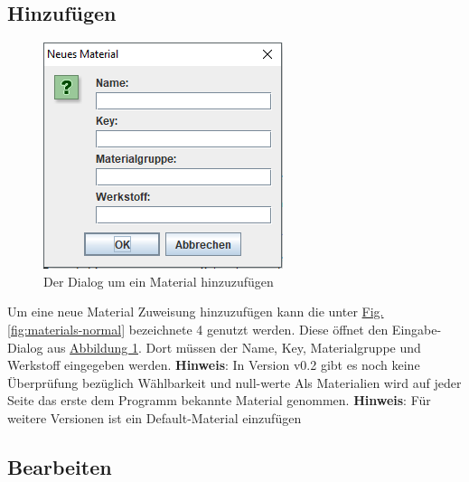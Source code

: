 \documentclass{book}
\newcommand{\hinweis}[1]{\newline \textbf{Hinweis}: #1 \newline}
\begin{document}
			\subsection{Hinzufügen}	\label{material-hinzufuegen}		
				\begin{figure}
					\includegraphics[scale=0.48]{pics/assisttool/materials-add.PNG}
					\caption{Der Dialog um ein Material hinzuzufügen}
					\label{fig:materials add}
				\end{figure}
				Um eine neue Material Zuweisung hinzuzufügen kann die unter \hyperref[fig:materials-normal]{Fig. \ref{fig:materials-normal}} bezeichnete 4 genutzt werden. Diese öffnet den Eingabe-Dialog aus \hyperref[fig:materials add]{Abbildung \ref{fig:materials add}}. Dort müssen der Name, Key, Materialgruppe und Werkstoff eingegeben werden. 
				\hinweis{In Version v0.2 gibt es noch keine Überprüfung bezüglich Wählbarkeit und null-werte}
				Als Materialien wird auf jeder Seite das erste dem Programm bekannte Material genommen.
				\hinweis{Für weitere Versionen ist ein Default-Material einzufügen}
			\subsection{Bearbeiten}
				
\end{document}
